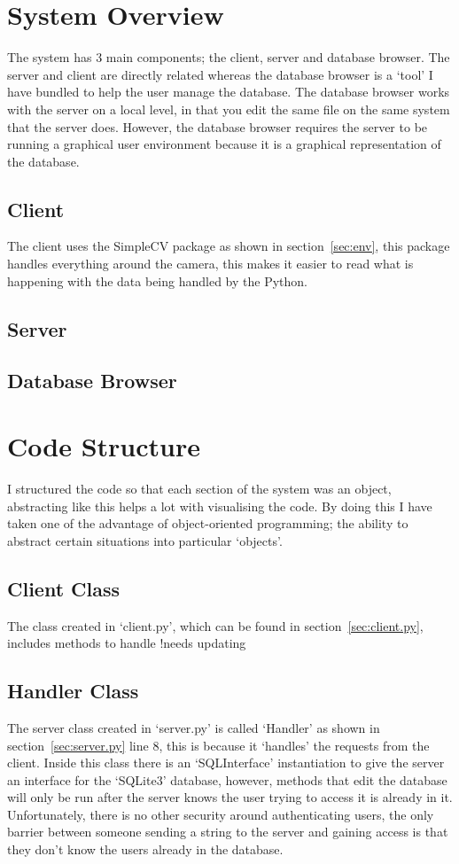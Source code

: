 \documentclass[a4paper]{article}
\begin{document}
\section{System Overview}
The system has 3 main components; the client, server and database browser. The server and client are directly related
whereas the database browser is a `tool' I have bundled to help the user manage the database. The database browser works
with the server on a local level, in that you edit the same file on the same system that the server does. However,
the database browser requires the server to be running a graphical user environment because it is a graphical representation
of the database. 

\subsection{Client}
The client uses the SimpleCV package as shown in section~\ref{sec:env}, this package handles everything around the camera,
this makes it easier to read what is happening with the data being handled by the Python.  

\subsection{Server}


\subsection{Database Browser}

\section{Code Structure}
I structured the code so that each section of the system was an object, abstracting like this helps a lot with
visualising the code. By doing this I have taken one of the advantage of object-oriented programming; the ability
to abstract certain situations into particular `objects'.

\subsection{Client Class}
The class created in `client.py', which can be found in section~\ref{sec:client.py}, includes methods to handle
!needs updating

\subsection{Handler Class}
The server class created in `server.py' is called `Handler' as shown in section~\ref{sec:server.py} line 8, this is because it `handles' the requests from the
client. Inside this class there is an `SQLInterface' instantiation to give the server an interface for the `SQLite3'
database, however, methods that edit the database will only be run after the server knows the user trying to access
it is already in it. Unfortunately, there is no other security around authenticating users, the only barrier between
someone sending a string to the server and gaining access is that they don't know the users already in the database.
\end{document}
